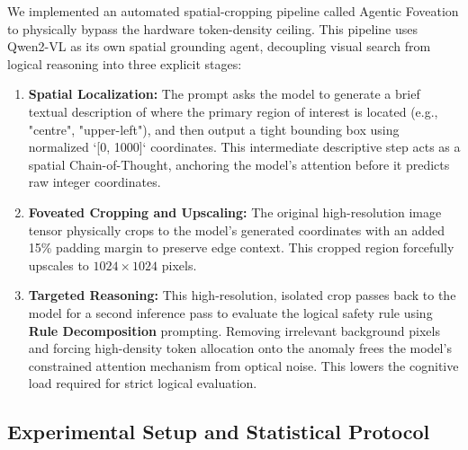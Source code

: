 \documentclass{article}
\begin{document}
We implemented an automated spatial-cropping pipeline called Agentic Foveation to physically bypass the hardware token-density ceiling. This pipeline uses Qwen2-VL as its own spatial grounding agent, decoupling visual search from logical reasoning into three explicit stages:
\begin{enumerate}
    \item \textbf{Spatial Localization:} The prompt asks the model to generate a brief textual description of where the primary region of interest is located (e.g., "centre", "upper-left"), and then output a tight bounding box using normalized `[0, 1000]` coordinates. This intermediate descriptive step acts as a spatial Chain-of-Thought, anchoring the model's attention before it predicts raw integer coordinates.
    \item \textbf{Foveated Cropping and Upscaling:} The original high-resolution image tensor physically crops to the model's generated coordinates with an added 15\% padding margin to preserve edge context. This cropped region forcefully upscales to $1024 \times 1024$ pixels. 
    \item \textbf{Targeted Reasoning:} This high-resolution, isolated crop passes back to the model for a second inference pass to evaluate the logical safety rule using \textbf{Rule Decomposition} prompting. Removing irrelevant background pixels and forcing high-density token allocation onto the anomaly frees the model's constrained attention mechanism from optical noise. This lowers the cognitive load required for strict logical evaluation.
\end{enumerate}

\subsection*{Experimental Setup and Statistical Protocol}
\end{document}
